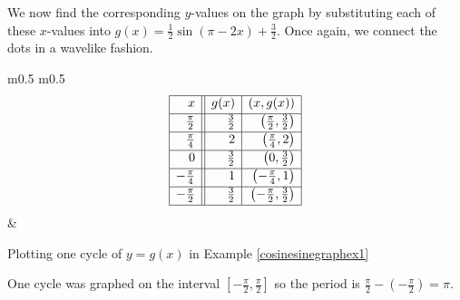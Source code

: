 {\begin{enumerate}
We now find the corresponding $y$-values on the graph by substituting each of these $x$-values into  $g(x) = \frac{1}{2} \sin(\pi - 2x) + \frac{3}{2}$.  Once again, we connect the dots in a wavelike fashion.

\medskip

\noindent\hskip-30pt\begin{minipage}{\textwidth}
\begin{center}
\begin{tabular}{m{} m{}}
\setlength{\extrarowheight}{2pt}
\setlength{\extrarowheight}{2pt}
\[ \begin{array}{|r||r|r|}  

\hline

 x & g(x) & (x,g(x)) \\ [2pt] \hline
\frac{\pi}{2} & \frac{3}{2} & \left(\frac{\pi}{2}, \frac{3}{2}\right)  \\ [2pt]   \hline

\frac{\pi}{4} & 2 & \left(\frac{\pi}{4}, 2\right) \\ [2pt] \hline 

0 & \frac{3}{2} & \left(0, \frac{3}{2} \right)  \\ [2pt] \hline 

-\frac{\pi}{4}  & 1 &  \left(-\frac{\pi}{4}, 1 \right) \\ [2pt] \hline 

-\frac{\pi}{2} & \frac{3}{2} & \left(-\frac{\pi}{2}, \frac{3}{2} \right) \\  [2pt] \hline
\end{array} \]
\setlength{\extrarowheight}{0pt} & 

\end{tabular}
\end{center}
\captionsetup{type=figure}
\caption{Plotting one cycle of $y=g(x)$ in Example \ref{cosinesinegraphex1}}
\end{minipage}

\medskip

One cycle was graphed on the interval $\left[ -\frac{\pi}{2}, \frac{\pi}{2}\right]$ so the period is $\frac{\pi}{2} - \left(-\frac{\pi}{2}\right) = \pi$. 

\end{enumerate}
}

\medskip

